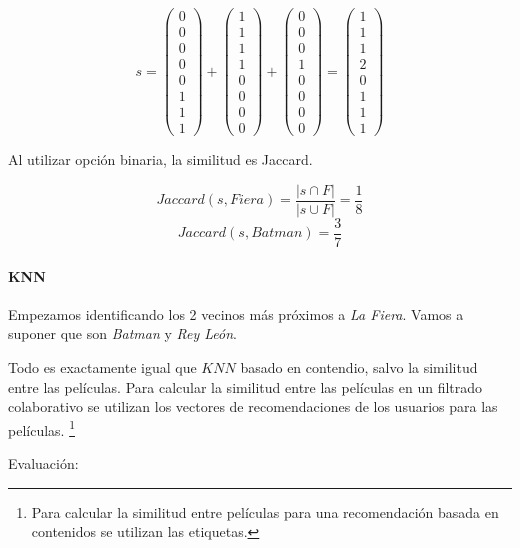 \begin{problem}[?]
\[
s = 
\begin{pmatrix}0\\0\\0\\0\\0\\1\\1\\1\end{pmatrix} +
\begin{pmatrix}1\\1\\1\\1\\0\\0\\0\\0\end{pmatrix}+
\begin{pmatrix}0\\0\\0\\1\\0\\0\\0\\0\end{pmatrix} =
\begin{pmatrix}1\\1\\1\\2\\0\\1\\1\\1\end{pmatrix}
\]

Al utilizar opción binaria, la similitud es Jaccard.


\[
	Jaccard(s,Fiera) = \frac{|s\cap F|}{|s\cup F|} = \frac{1}{8}
\]
\[
	Jaccard(s,Batman) = \frac{3}{7}
\]

\paragraph*{KNN}

Empezamos identificando los 2 vecinos más próximos a \textit{La Fiera}. Vamos a suponer que son \textit{Batman} y \textit{Rey León}.

Todo es exactamente igual que $KNN$ basado en contendio, salvo la similitud entre las películas. Para calcular la similitud entre las películas en un filtrado colaborativo se utilizan los vectores de recomendaciones de los usuarios para las películas. 
\footnote{Para calcular la similitud entre películas para una recomendación basada en contenidos se utilizan las etiquetas.}

\spart Evaluación:



\end{problem}
